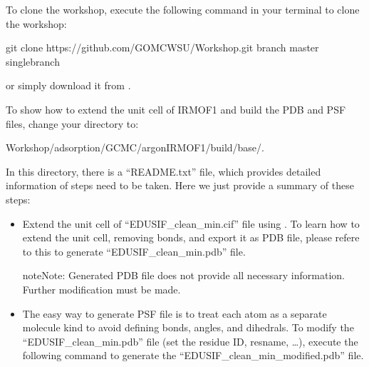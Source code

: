\documentclass[letterpaper,10pt,english]{sphinxmanual}
\begin{document}
\begin{enumerate}
\sphinxAtStartPar
To clone the workshop, execute the following command in your terminal to clone the workshop:

\begin{sphinxVerbatim}[commandchars=\\\{\}]
\PYGZdl{} git  clone    https://github.com/GOMC\PYGZhy{}WSU/Workshop.git \PYGZhy{}\PYGZhy{}branch master \PYGZhy{}\PYGZhy{}single\PYGZhy{}branch
\end{sphinxVerbatim}

\sphinxAtStartPar
or simply download it from  .

\sphinxAtStartPar
To show how to extend the unit cell of IRMOF\sphinxhyphen{}1 and build the PDB and PSF files, change your directory to:

\begin{sphinxVerbatim}[commandchars=\\\{\}]
\PYGZdl{}    Workshop/adsorption/GCMC/argon\PYGZus{}IRMOF\PYGZus{}1/build/base/.
\end{sphinxVerbatim}

\sphinxAtStartPar
In this directory, there is a “README.txt” file, which provides detailed information of steps need to be taken. Here we just provide a summary of these steps:
\begin{itemize}
\item {} 
\sphinxAtStartPar
Extend the unit cell of “EDUSIF\_clean\_min.cif” file using . To learn how to extend the
unit cell, removing bonds, and export it as PDB file, please refere to this  to generate “EDUSIF\_clean\_min.pdb” file.

\begin{sphinxadmonition}{note}{Note:}
\sphinxAtStartPar
Generated PDB file does not provide all necessary information. Further modification must be made.
\end{sphinxadmonition}

\item {} 
\sphinxAtStartPar
The easy way to generate PSF file is to treat each atom as a separate molecule kind to avoid defining bonds, angles, and dihedrals. To modify the “EDUSIF\_clean\_min.pdb” file (set the residue ID, resname, …), execute the following command to generate the
“EDUSIF\_clean\_min\_modified.pdb” file.


\end{itemize}
\end{enumerate}
\end{document}

